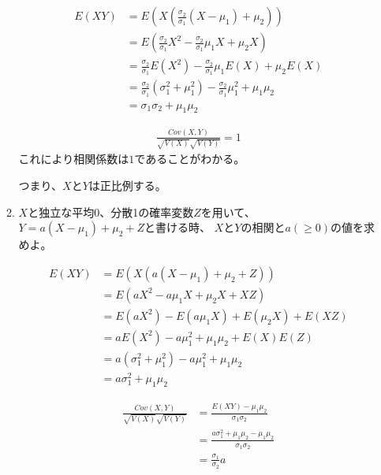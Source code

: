 \documentclass[12pt,b5paper]{ltjsarticle}
\begin{document}
\begin{enumerate}
\begin{enumerate}
            \begin{align}
             E(XY) &= E\left( X \left( \frac{\sigma_{2}}{\sigma_{1}}(X-\mu_{1})+\mu_{2} \right) \right)\\
             &= E \left(
              \frac{\sigma_{2}}{\sigma_{1}}X^{2}-\frac{\sigma_{2}}{\sigma_{1}}\mu_{1}X +\mu_{2}X
             \right)\\
             &=
             \frac{\sigma_{2}}{\sigma_{1}}E(X^{2})-\frac{\sigma_{2}}{\sigma_{1}}\mu_{1}E(X) +\mu_{2}E(X)\\
             &=
             \frac{\sigma_{2}}{\sigma_{1}}(\sigma_{1}^{2} +\mu_{1}^{2})-\frac{\sigma_{2}}{\sigma_{1}}\mu_{1}^{2} +\mu_{1}\mu_{2}\\
             &= \sigma_{1}\sigma_{2} + \mu_{1}\mu_{2}
            \end{align}


            \begin{gather}
             \frac{Cov(X,Y)}{\sqrt{V(X)}\sqrt{V(Y)}}
             =1
            \end{gather}
            これにより相関係数は$1$であることがわかる。

            つまり、$X$と$Y$は正比例する。

            \hrulefill
       \item
            $X$と独立な平均0、分散1の確率変数$Z$を用いて、
            $Y=a(X-\mu_{1})+\mu_{2}+Z$と書ける時、
            $X$と$Y$の相関と$a (\geq 0)$の値を求めよ。

            \dotfill

            \begin{align}
             E(XY)
             &= E\left( X (a(X-\mu_{1})+\mu_{2} +Z) \right)\\
             &= E \left( aX^{2} -a\mu_{1}X +\mu_{2}X +XZ \right)\\
             &= E (aX^{2}) - E(a\mu_{1}X) + E(\mu_{2}X) + E(XZ)\\
             &= aE (X^{2}) - a\mu_{1}^{2} + \mu_{1}\mu_{2} + E(X)E(Z)\\
             &= a(\sigma_{1}^{2}+\mu_{1}^{2}) - a\mu_{1}^{2} + \mu_{1}\mu_{2}\\
             &= a\sigma_{1}^{2} + \mu_{1}\mu_{2}
            \end{align}

            \begin{align}
             \frac{Cov(X,Y)}{\sqrt{V(X)}\sqrt{V(Y)}}
             &= \frac{ E(XY) - \mu_{1}\mu_{2} }{ \sigma_{1} \sigma_{2} }\\
             &= \frac{ a\sigma_{1}^{2} + \mu_{1}\mu_{2} - \mu_{1}\mu_{2} }{ \sigma_{1} \sigma_{2} }\\
             &= \frac{\sigma_{1}}{\sigma_{2}}a
            \end{align}


\end{enumerate}
\end{enumerate}
\end{document}
